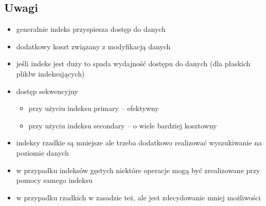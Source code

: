 \documentclass[12pt]{article}
\begin{document}
\subsection{Uwagi}
\begin{itemize}
\item generalnie indeks przyspiesza dostęp do danych
\item dodatkowy koszt związany z modyfikacją danych
\item jeśli indeks jest duży to spada wydajność dostępu do danych (dla płaskich plikłw indeksujących)
\item dostęp sekwencyjny
\begin{itemize}
\item przy użyciu indeksu primary -- efektywny
\item przy użyciu indeksu secondary -- o wiele bardziej kosztowny
\end{itemize}
\item indeksy rzadkie są mniejsze ale trzeba dodatkowo realizować wyszukiwanie na poziomie danych
\item w przypadku indeksów gęstych niektóre operacje mogą być zrealizowane przy pomocy samego indeksu
\item w przypadku rzadkich w zasadzie też, ale jest zdecydowanie mniej możliwości
\end{itemize}
\begin{comment}

\subsection{ac{B--Tree}}
\begin{comment}
	* B- balanced - zrownowazone
	* Wezel
		K_1, P_1, K_2, P_2, ...., K_n, P_n
		- K - klucz
		- P - pointer
		- n - rozmiar
		- klucze sa uporzadkowane
		

B+ drzewa (wypelnienie wezlow)
  * Glebokosc B+ drzewa
    - K- liczba kluczy
    - Log_[n/2](K)
    - np. K = 1 000 000
          n = 100
          glebokosc = 4

  * B drzewa - najczestszy sposob organizacji
    - wydajny jesli chodzi o dostep "random"
    - wydany jesli chodzi o dostep sekwencyjny

Hash
  * Funkcja haszujaca
    - Key - > h(key)
  * Struktury typu hash
    - Statyczne
    - Dynamiczne (linear hashing, extensible hashing)
  * Podsumowanie
    - Struktury typu hash daja lepsze efekty jesli chodzi o dostep bezposredni
    - Problemy przy zapytaniach typu : zakres wartosci

SQL - indeksy

  CREATE INDEX <index-name> ON <relation-name> (<attribute-list>)

  CREATE INDEX b-index ON branch(branch-name)

  CREATE UNIQUE INDEX b-index ON branch(branch-name)

  DROP INDEX <index-name>

  FILL FACTOR <procent>

  FILL FACTOR 10%

\end{comment}
\end{document}
